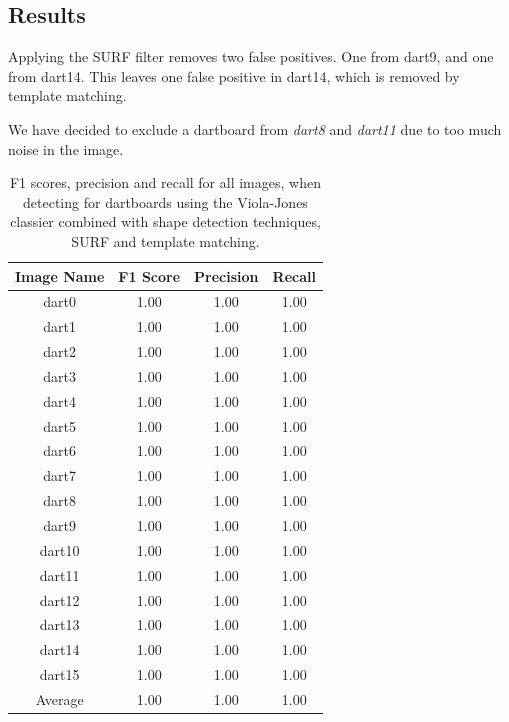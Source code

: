 \documentclass[conference]{IEEEtran}
\begin{document}
\subsection{Results}
Applying the SURF filter removes two false positives. One from dart9, and one from dart14. This leaves one false positive in dart14, which is removed by template matching.
\par
We have decided to exclude a dartboard from \emph{dart8} and \emph{dart11} due to too much noise in the image. 
\begin{table}[!htp]
\caption{F1 scores, precision and recall for all images, when detecting for dartboards using the Viola-Jones classier combined with shape detection techniques, SURF and template matching. }
\begin{center}
\begin{tabular}{||c|c|c|c||}
\hline
Image Name		 	& F1 Score 	& Precision	& Recall            \\ \hline
dart0					& 1.00		&	1.00		& 1.00		\\
dart1					& 1.00		&	1.00		& 1.00		\\
dart2					& 1.00		&	1.00		& 1.00		\\
dart3					& 1.00		&	1.00		& 1.00		\\
dart4					& 1.00		&	1.00		& 1.00		\\
dart5					& 1.00		&	1.00		& 1.00		\\
dart6					& 1.00		&	1.00		& 1.00		\\
dart7					& 1.00		&	1.00		& 1.00		\\
dart8					& 1.00		&	1.00		& 1.00		\\
dart9					& 1.00		&	1.00		& 1.00		\\
dart10				& 1.00		&	1.00		& 1.00		\\
dart11				& 1.00		&	1.00		& 1.00		\\
dart12				& 1.00		&	1.00		& 1.00		\\
dart13				& 1.00		&	1.00		& 1.00		\\
dart14				& 1.00		&	1.00		& 1.00		\\
dart15				& 1.00		&	1.00		& 1.00		\\ \hline
Average 		 		& 1.00		&	1.00		& 1.00 		\\ \hline
\end{tabular}
\end{center}
\label{default}
\end{table}
\end{document}
